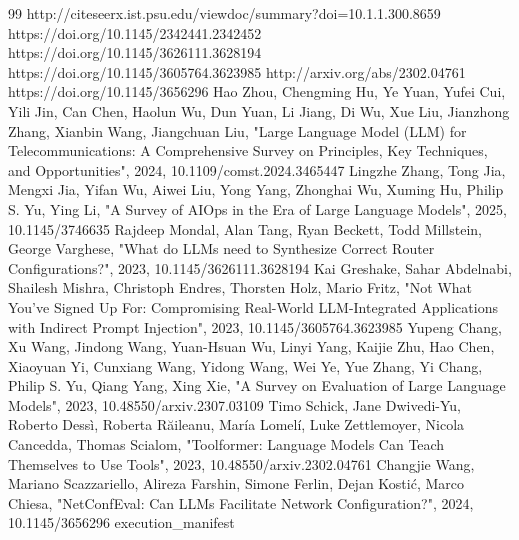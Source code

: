 \documentclass[conference]{IEEEtran}
\begin{document}
\begin{thebibliography}{99}
 http://citeseerx.ist.psu.edu/viewdoc/summary?doi=10.1.1.300.8659
 https://doi.org/10.1145/2342441.2342452
 https://doi.org/10.1145/3626111.3628194
 https://doi.org/10.1145/3605764.3623985
 http://arxiv.org/abs/2302.04761
 https://doi.org/10.1145/3656296
 Hao Zhou, Chengming Hu, Ye Yuan, Yufei Cui, Yili Jin, Can Chen, Haolun Wu, Dun Yuan, Li Jiang, Di Wu, Xue Liu, Jianzhong Zhang, Xianbin Wang, Jiangchuan Liu, "Large Language Model (LLM) for Telecommunications: A Comprehensive Survey on Principles, Key Techniques, and Opportunities", 2024, 10.1109/comst.2024.3465447
 Lingzhe Zhang, Tong Jia, Mengxi Jia, Yifan Wu, Aiwei Liu, Yong Yang, Zhonghai Wu, Xuming Hu, Philip S. Yu, Ying Li, "A Survey of AIOps in the Era of Large Language Models", 2025, 10.1145/3746635
 Rajdeep Mondal, Alan Tang, Ryan Beckett, Todd Millstein, George Varghese, "What do LLMs need to Synthesize Correct Router Configurations?", 2023, 10.1145/3626111.3628194
 Kai Greshake, Sahar Abdelnabi, Shailesh Mishra, Christoph Endres, Thorsten Holz, Mario Fritz, "Not What You've Signed Up For: Compromising Real-World LLM-Integrated Applications with Indirect Prompt Injection", 2023, 10.1145/3605764.3623985
 Yupeng Chang, Xu Wang, Jindong Wang, Yuan-Hsuan Wu, Linyi Yang, Kaijie Zhu, Hao Chen, Xiaoyuan Yi, Cunxiang Wang, Yidong Wang, Wei Ye, Yue Zhang, Yi Chang, Philip S. Yu, Qiang Yang, Xing Xie, "A Survey on Evaluation of Large Language Models", 2023, 10.48550/arxiv.2307.03109
 Timo Schick, Jane Dwivedi-Yu, Roberto Dessì, Roberta Răileanu, María Lomelí, Luke Zettlemoyer, Nicola Cancedda, Thomas Scialom, "Toolformer: Language Models Can Teach Themselves to Use Tools", 2023, 10.48550/arxiv.2302.04761
 Changjie Wang, Mariano Scazzariello, Alireza Farshin, Simone Ferlin, Dejan Kostić, Marco Chiesa, "NetConfEval: Can LLMs Facilitate Network Configuration?", 2024, 10.1145/3656296
 execution\_manifest
\end{thebibliography}
\end{document}
